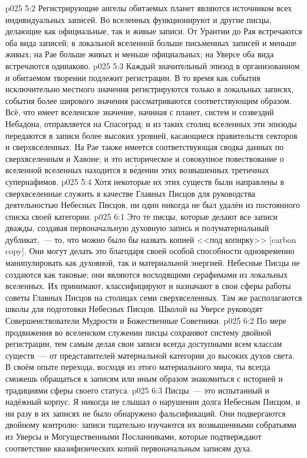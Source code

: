 \vs p025 5:2 Регистрирующие ангелы обитаемых планет являются источником всех индивидуальных записей. Во вселенных функционируют и другие писцы, делающие как официальные, так и живые записи. От Урантии до Рая встречаются оба вида записей; в локальной вселенной больше письменных записей и меньше живых; на Рае больше живых и меньше официальных; на Уверсе оба вида встречаются одинаково.
\vs p025 5:3 Каждый значительный эпизод в организованном и обитаемом творении подлежит регистрации. В то время как события исключительно местного значения регистрируются только в локальных записях, события более широкого значения рассматриваются соответствующим образом. Всё, что имеет вселенское значение, начиная с планет, систем и созвездий Небадона, отправляется на Спасоград; и из таких столиц вселенных эти эпизоды передаются в записи более высоких уровней, касающиеся правительств секторов и сверхвселенных. На Рае также имеется соответствующая сводка данных по сверхвселенным и Хавоне; и это историческое и совокупное повествование о вселенной вселенных находится в в\'едении этих возвышенных третичных супернафимов.
\vs p025 5:4 Хотя некоторые их этих существ были направлены в сверхвселенные служить в качестве Главных Писцов для руководства деятельностью Небесных Писцов, ни один никогда не был удалён из постоянного списка своей категории.
\vs p025 6:1 Это те писцы, которые делают все записи дважды, создавая первоначальную духовную запись и полуматериальный дубликат,~--- то, что можно было бы назвать копией <<под копирку>> [carbon copy]. Они могут делать это благодаря своей особой способности одновременно манипулировать как духовной, так и материальной энергией. Небесные Писцы не создаются как таковые; они являются восходящими серафимами из локальных вселенных. Их принимают, классифицируют и назначают в свои сферы работы советы Главных Писцов на столицах семи сверхвселенных. Там же располагаются школы для подготовки Небесных Писцов. Школой на Уверсе руководят Совершенствователи Мудрости и Божественные Советники.
\vs p025 6:2 По мере продвижения во вселенском служении писцы сохраняют систему двойной регистрации, тем самым делая свои записи всегда доступными всем классам существ~--- от представителей материальной категории до высоких духов света. В своём опыте перехода, восходя из этого материального мира, ты всегда сможешь обращаться к записям или иным образом знакомиться с историей и традициями сферы своего статуса.
\vs p025 6:3 Писцы~--- это испытанный и надёжный корпус. Я никогда не слышал о нарушении долга Небесным Писцом, и ни разу в их записях не было обнаружено фальсификаций. Они подвергаются двойному контролю: записи тщательно изучаются их возвышенными собратьями из Уверсы и Могущественными Посланниками, которые подтверждают соответствие квазифизических копий первоначальным записям духа.
